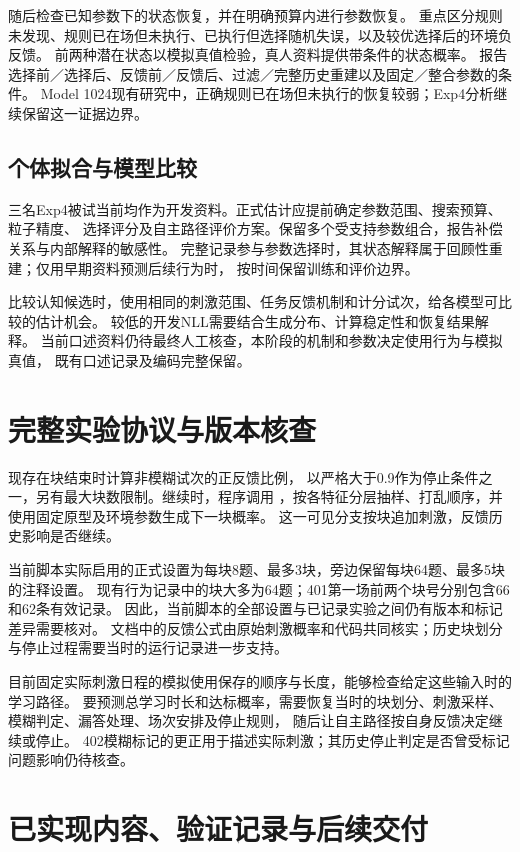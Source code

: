 \documentclass[11pt,a4paper]{article}
\numberwithin{equation}{section}
\begin{document}
随后检查已知参数下的状态恢复，并在明确预算内进行参数恢复。
重点区分规则未发现、规则已在场但未执行、已执行但选择随机失误，以及较优选择后的环境负反馈。
前两种潜在状态以模拟真值检验，真人资料提供带条件的状态概率。
报告选择前／选择后、反馈前／反馈后、过滤／完整历史重建以及固定／整合参数的条件。
Model 1024现有研究中，正确规则已在场但未执行的恢复较弱；Exp4分析继续保留这一证据边界。

\subsection{个体拟合与模型比较}
三名Exp4被试当前均作为开发资料。正式估计应提前确定参数范围、搜索预算、粒子精度、
选择评分及自主路径评价方案。保留多个受支持参数组合，报告补偿关系与内部解释的敏感性。
完整记录参与参数选择时，其状态解释属于回顾性重建；仅用早期资料预测后续行为时，
按时间保留训练和评价边界。

比较认知候选时，使用相同的刺激范围、任务反馈机制和计分试次，给各模型可比较的估计机会。
较低的开发NLL需要结合生成分布、计算稳定性和恢复结果解释。
当前口述资料仍待最终人工核查，本阶段的机制和参数决定使用行为与模拟真值，
既有口述记录及编码完整保留。

\section{完整实验协议与版本核查}
\label{sec:protocol}

现存在块结束时计算非模糊试次的正反馈比例，
以严格大于0.9作为停止条件之一，另有最大块数限制。继续时，程序调用
，按各特征分层抽样、打乱顺序，并使用固定原型及环境参数生成下一块概率。
这一可见分支按块追加刺激，反馈历史影响是否继续。

当前脚本实际启用的正式设置为每块8题、最多3块，旁边保留每块64题、最多5块的注释设置。
现有行为记录中的块大多为64题；401第一场前两个块号分别包含66和62条有效记录。
因此，当前脚本的全部设置与已记录实验之间仍有版本和标记差异需要核对。
文档中的反馈公式由原始刺激概率和代码共同核实；历史块划分与停止过程需要当时的运行记录进一步支持。

目前固定实际刺激日程的模拟使用保存的顺序与长度，能够检查给定这些输入时的学习路径。
要预测总学习时长和达标概率，需要恢复当时的块划分、刺激采样、模糊判定、漏答处理、场次安排及停止规则，
随后让自主路径按自身反馈决定继续或停止。
402模糊标记的更正用于描述实际刺激；其历史停止判定是否曾受标记问题影响仍待核查。

\section{已实现内容、验证记录与后续交付}
\label{sec:implementation}
\end{document}
